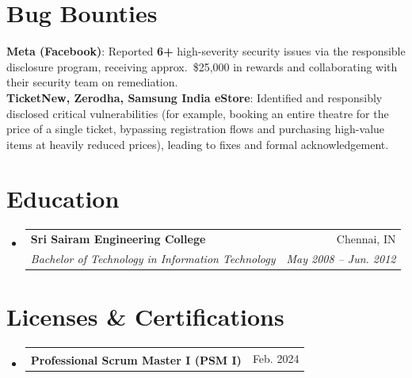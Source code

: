 \documentclass[a4paper,11pt]{article}
\makeatletter
\newcommand{\resumeSubheading}[4]{
  \vspace{-2pt}\item
    \begin{tabular*}{0.97\textwidth}[t]{l@{\extracolsep{\fill}}r}
      \textbf{#1} & #2 \\
      \textit{\small #3} & \textit{\small #4} \\
    \end{tabular*}\vspace{-7pt}
}
\newcommand{\resumeProjectHeading}[2]{
    \item
    \begin{tabular*}{0.97\textwidth}{l@{\extracolsep{\fill}}r}
      \small #1 & #2 \\
    \end{tabular*}\vspace{-7pt}
}
\newcommand{\resumeSubHeadingListStart}{\begin{itemize}[leftmargin=0.15in, label={}]}
\newcommand{\resumeSubHeadingListEnd}{\end{itemize}}
\makeatother
\begin{document}
\section{Bug Bounties}
 \begin{itemize}[leftmargin=0.15in, label={}]
    \small{\item{
      \textbf{Meta (Facebook)}: Reported \textbf{6+} high-severity security issues via the responsible disclosure program, receiving approx.\ \$25{,}000 in rewards and collaborating with their security team on remediation. \\
      \textbf{TicketNew, Zerodha, Samsung India eStore}: Identified and responsibly disclosed critical vulnerabilities (for example, booking an entire theatre for the price of a single ticket, bypassing registration flows and purchasing high-value items at heavily reduced prices), leading to fixes and formal acknowledgement.\\
     }}
 \end{itemize}

\section{Education}
  \resumeSubHeadingListStart
    \resumeSubheading
      {Sri Sairam Engineering College}{Chennai, IN}
      {Bachelor of Technology in Information Technology}{May 2008 -- Jun. 2012}
  \resumeSubHeadingListEnd

\section{Licenses \& Certifications}
  \resumeSubHeadingListStart
    \resumeProjectHeading
      {\textbf{Professional Scrum Master\textsuperscript{\texttrademark} I (PSM I)}}{Feb. 2024}
  \resumeSubHeadingListEnd

\end{document}
